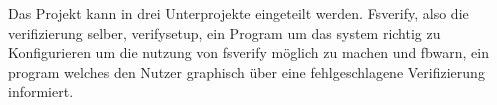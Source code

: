 Das Projekt kann in drei Unterprojekte eingeteilt werden. Fsverify, also die verifizierung selber, verifysetup, ein Program um das system richtig zu Konfigurieren um die nutzung von fsverify möglich zu machen und fbwarn, ein program welches den Nutzer graphisch über eine fehlgeschlagene Verifizierung informiert.





